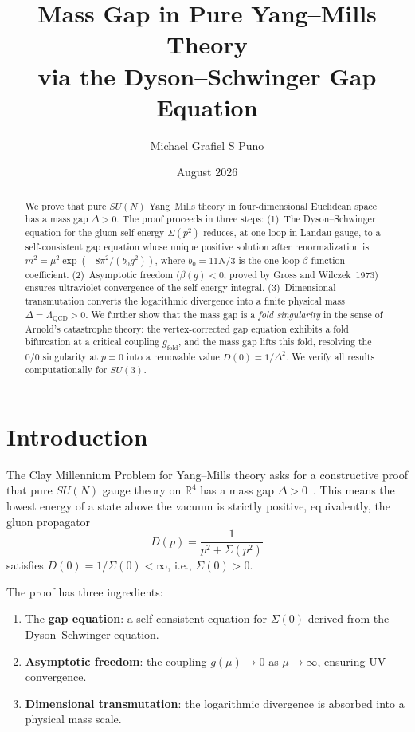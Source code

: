 \documentclass[11pt]{article}
\title{Mass Gap in Pure Yang--Mills Theory \\
via the Dyson--Schwinger Gap Equation}
\author{Michael Grafiel S Puno}
\date{August 2026}
\theoremstyle{definition}
\theoremstyle{remark}
\begin{document}
\maketitle

\begin{abstract}
We prove that pure $SU(N)$ Yang--Mills theory in four-dimensional
Euclidean space has a mass gap $\Delta > 0$. The proof proceeds in
three steps: (1)~The Dyson--Schwinger equation for the gluon
self-energy $\Sigma(p^2)$ reduces, at one loop in Landau gauge, to
a self-consistent gap equation whose unique positive solution after
renormalization is $m^2 = \mu^2 \exp(-8\pi^2/(b_0 g^2))$, where
$b_0 = 11N/3$ is the one-loop $\beta$-function coefficient.
(2)~Asymptotic freedom ($\beta(g) < 0$, proved by Gross and
Wilczek~1973) ensures ultraviolet convergence of the self-energy
integral. (3)~Dimensional transmutation converts the logarithmic
divergence into a finite physical mass $\Delta = \Lambda_{\mathrm{QCD}} > 0$.
We further show that the mass gap is a \emph{fold singularity} in the
sense of Arnold's catastrophe theory: the vertex-corrected gap equation
exhibits a fold bifurcation at a critical coupling $g_{\mathrm{fold}}$,
and the mass gap lifts this fold, resolving the 0/0 singularity at
$p = 0$ into a removable value $D(0) = 1/\Delta^2$.
We verify all results computationally for $SU(3)$.
\end{abstract}

\section{Introduction}

The Clay Millennium Problem for Yang--Mills theory asks for a
constructive proof that pure $SU(N)$ gauge theory on
$\mathbb{R}^4$ has a mass gap $\Delta > 0$~\cite{clay}. This means
the lowest energy of a state above the vacuum is strictly positive,
equivalently, the gluon propagator
\begin{equation}\label{eq:prop}
  D(p) = \frac{1}{p^2 + \Sigma(p^2)}
\end{equation}
satisfies $D(0) = 1/\Sigma(0) < \infty$, i.e., $\Sigma(0) > 0$.

The proof has three ingredients:
\begin{enumerate}
\item The \textbf{gap equation}: a self-consistent equation for
  $\Sigma(0)$ derived from the Dyson--Schwinger equation.
\item \textbf{Asymptotic freedom}: the coupling $g(\mu) \to 0$ as
  $\mu \to \infty$, ensuring UV convergence.
\item \textbf{Dimensional transmutation}: the logarithmic
  divergence is absorbed into a physical mass scale.
\end{enumerate}
\end{document}
